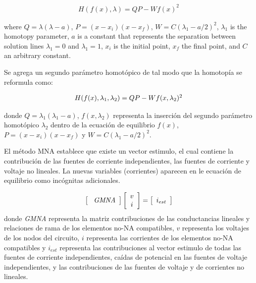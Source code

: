 \documentclass[conference,letterpaper,twocolumn]{IEEEtran}
\begin{document}
\begin{equation}
{
\begin{array}{l}
{H}({f}({x}),\lambda )=QP - W {f}({x})^2
\end{array}}
\label{homotopiaP}
\end{equation}

where $Q=\lambda(\lambda-a)$,  $P=(x-x_i)(x-x_f)$, $W=C(\lambda_1-a/2)^2$, $\lambda_1$ is the homotopy parameter, $a$ is a constant that represents the separation between solution lines $\lambda_1=0$ and $\lambda_1=1$, $x_i$ is the initial point, $x_f$ the final point, and $C$ an arbitrary constant.


Se agrega un segundo parámetro homotópico de tal modo que la homotopía se reformula como:

\begin{equation}
{\small
\begin{array}{l}
{H}({f}({x}),\lambda_1, \lambda_2 )=QP - W {f}({x},\lambda_2)^2
\end{array}}
\label{homotopiaPx1}
\end{equation}

donde $Q=\lambda_1(\lambda_1-a)$, ${f}({x},\lambda_2)$ representa la inserción del segundo parámetro homotópico $\lambda_2$ dentro de la ecuación de equilibrio ${f}({x})$, $P=(x-x_i)(x-x_f)$ y $W=C(\lambda_1-a/2)^2$.

El método MNA establece que existe un vector estimulo, el cual contiene la contribución
de  las fuentes de corriente independientes, las fuentes de corriente y voltaje no lineales. 
La nuevas
variables (corrientes) aparecen en le ecuación de equilibrio como incógnitas adicionales.

\begin{equation}
\left[ \begin{array}{c}
\text{ \it GMNA}
\end{array} \right]
\left[ \begin{array}{c}
{v} \\
{i} \\
\end{array} \right]
=
\left[ \begin{array}{c}
{i_{est}}
\end{array} \right]
\end{equation}
donde {\it GMNA} representa la matriz contribuciones de las conductancias lineales y relaciones de rama de los elementos no-NA compatibles,
${v}$   representa los voltajes de  los nodos del circuito, ${i}$  representa las corrientes de los elementos no-NA compatibles y ${i_{est}}$ representa las contribuciones
al vector estimulo de todas las fuentes de corriente independientes,  caídas de potencial en las fuentes de voltaje independientes, y las contribuciones de las fuentes de voltaje y de corrientes no lineales.
\end{document}
